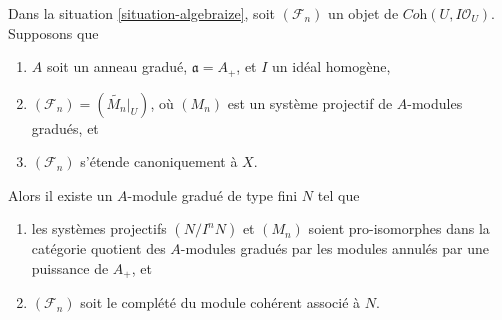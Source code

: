 \begin{lemma}
\label{lemma-Gm-equivariant-extend-canonically}
Dans la situation \ref{situation-algebraize}, soit $(\mathcal{F}_n)$ un
objet de $\textit{Coh}(U, I\mathcal{O}_U)$. Supposons que
\begin{enumerate}
\item $A$ soit un anneau gradué, $\mathfrak a = A_+$, et
$I$ un idéal homogène,
\item $(\mathcal{F}_n) = (\widetilde{M_n}|_U)$, où $(M_n)$
est un système projectif de $A$-modules gradués, et
\item $(\mathcal{F}_n)$ s'étende canoniquement à $X$.
\end{enumerate}
Alors il existe un $A$-module gradué de type fini $N$ tel que
\begin{enumerate}
\item[(a)] les systèmes projectifs $(N/I^nN)$ et $(M_n)$ soient pro-isomorphes
dans la catégorie quotient des $A$-modules gradués par les modules annulés par une puissance de $A_+$,
et
\item[(b)] $(\mathcal{F}_n)$ soit le complété du module cohérent
associé à $N$.
\end{enumerate}
\end{lemma}

